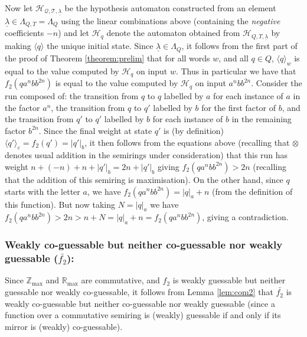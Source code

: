 \documentclass{lmcs}
\numberwithin{theorem}{section}
\begin{document}
         Now let $\mathcal{H_{Q,T, \underline{\lambda}}}$ be the hypothesis automaton constructed from an element $\underline{\lambda} \in \Lambda_{Q, T} = \Lambda_Q$ using the linear combinations above (containing the \emph{negative} coefficients $-n$) and let $\mathcal{H}_q$ denote the automaton obtained from $\mathcal{H}_{Q, T, \underline{\lambda}}$ by making $\langle q \rangle$ the unique initial state. Since $\underline{\lambda} \in \Lambda_Q$, it follows from the first part of the proof of Theorem \ref{theorem:prelim} that for all words $w$, and all $q \in Q$, $\langle q \rangle_w$ is equal to the value computed by $\mathcal{H}_q$ on input $w$. Thus in particular we have that $f_2(qa^nbb^{2n})$ is equal to the value computed by $\mathcal{H}_q$ on input $a^nbb^{2n}$. Consider the run composed of: the transition from $q$ to $q$ labelled by $a$ for each instance of $a$ in the factor $a^n$, the transition from $q$ to $q'$ labelled by $b$ for the first factor of $b$, and the transition from $q'$ to $q'$ labelled by $b$  for each instance of $b$ in the remaining factor $b^{2n}$. Since the final weight at state $q'$ is (by definition) $\langle q' \rangle_\varepsilon = f_2(q') = |q'|_b$, it then follows from the equations above (recalling that $\otimes$ denotes usual addition in the semirings under consideration) that this run has weight $n+  (-n) +n + |q'|_b = 2n + |q'|_b $ giving $f_2(qa^nbb^{2n}) > 2n$ (recalling that the addition of this semiring is maximisation). On the other hand, since $q$ starts with the letter $a$, we have $f_2(qa^nbb^{2n}) = |q|_a + n$ (from the definition of this function). But now taking $N=|q|_a$ we have $f_2(qa^nbb^{2n}) > 2n> n + N = |q|_a + n = f_2(qa^nbb^{2n})$, giving a contradiction.
	\subsubsection*{\textbf{Weakly co-guessable but neither co-guessable nor weakly guessable ($\bar{f_2}$):}}
	Since $\mathbb{Z}_{\max}$ and $\mathbb{R}_{\max}$ are commutative, and $f_2$ is weakly guessable but neither guessable nor weakly co-guessable, it follows from Lemma \ref{lem:com2} that  $\bar{f_2}$ is weakly co-guessable but neither co-guessable nor weakly guessable (since a function over a commutative semiring is (weakly) guessable if and only if its mirror is (weakly) co-guessable).
	
\end{document}
